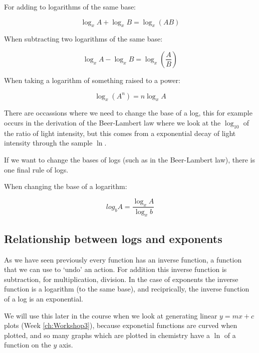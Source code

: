 \documentclass[
]{book}
\begin{document}
For adding to logarithms of the same base:

\begin{equation}
\log_x A + \log_x B = \log_x (AB)
\label{eq:logadd}
\end{equation}

When subtracting two logarithms of the same base:

\begin{equation}
\log_x A  - \log_x B = \log_x \left(\frac{A}{B}\right)
\label{eq:logsub}
\end{equation}

When taking a logarithm of something raised to a power:

\begin{equation}
\log_x (A^n)= n \log_x A
\label{eq:logpower}
\end{equation}

There are occassions where we need to change the base of a log, this for example occurs in the derivation of the Beer-Lambert law where we look at the \(\log_{10}\) of the ratio of light intensity, but this comes from a exponential decay of light intensity through the sample \(\ln\).

If we want to change the bases of logs (such as in the Beer-Lambert law), there is one final rule of logs.

When changing the base of a logarithm:

\begin{equation}
log_b A = \frac{\log_x A}{\log_x b}
\label{eq:convpower}
\end{equation}

\hypertarget{relationship-between-logs-and-exponents}{%
\subsection{Relationship between logs and exponents}\label{relationship-between-logs-and-exponents}}

As we have seen previously every function has an inverse function, a function that we can use to `undo' an action. For addition this inverse function is subtraction, for multiplication, division. In the case of exponents the inverse function is a logarithm (to the same base), and reciprically, the inverse function of a log is an exponential.

We will use this later in the course when we look at generating linear \(y=mx+c\) plots (Week \ref{ch:Workshop3}), because exponetial functions are curved when plotted, and so many graphs which are plotted in chemistry have a \(\ln\) of a function on the \(y\) axis.
\end{document}
